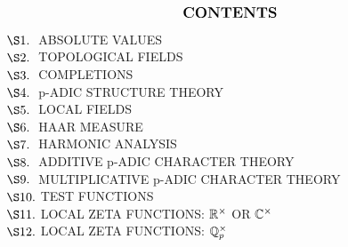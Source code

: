 
\begingroup%
\fontsize{8pt}{8pt}\selectfont

\[
\text{\large\bf CONTENTS}
\]
 
 \vspace{0.3cm}
 
 \normalsize

\qquad $\S1.\ $ \qquad ABSOLUTE VALUES\\

\qquad $\S2.\ $ \qquad TOPOLOGICAL FIELDS\\

\qquad $\S3.\ $ \qquad COMPLETIONS\\

\qquad $\S4.\ $ \qquad p-ADIC STRUCTURE THEORY\\

\qquad $\S5.\ $ \qquad LOCAL FIELDS\\

\qquad $\S6.\ $ \qquad HAAR MEASURE\\

\qquad $\S7.\ $ \qquad HARMONIC ANALYSIS\\

\qquad $\S8.\ $ \qquad ADDITIVE p-ADIC CHARACTER THEORY\\

\qquad $\S9.\ $ \qquad MULTIPLICATIVE p-ADIC CHARACTER THEORY\\

\qquad $\S10.$ \qquad TEST FUNCTIONS\\

\qquad $\S11.$ \qquad LOCAL ZETA FUNCTIONS: $\mathbb{R}^\times$ OR $\mathbb{C}^\times$\\

\qquad $\S12.$ \qquad LOCAL ZETA FUNCTIONS: $\mathbb{Q}^\times_p$\\

